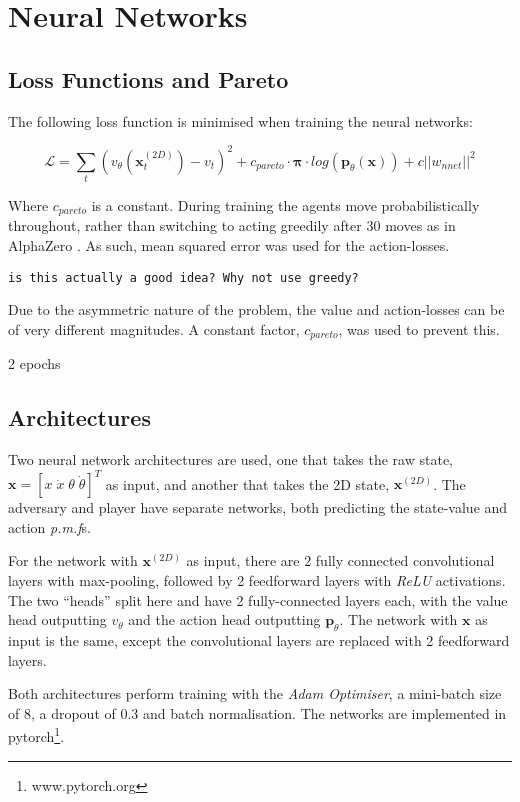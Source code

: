 \documentclass[../main.tex]{subfiles}
\begin{document}
\section{Neural Networks}
\subsection{Loss Functions and Pareto}

The following loss function is minimised when training the neural networks:

\begin{equation}
   \mathcal{L} = \sum_t (v_\theta (\boldsymbol{x}^{(2D)}_t) - v_t)^2 + c_{pareto} \cdot \boldsymbol{\pi} \cdot log(\boldsymbol{p}_\theta(\boldsymbol{x}))  + c||w_{nnet}||^2
\end{equation}

Where $c_{pareto}$ is a constant. During training the agents move probabilistically throughout, rather than switching to acting greedily after 30 moves as in AlphaZero \cite{AlphaZero}. As such, mean squared error was used for the action-losses.

\texttt{is this actually a good idea? Why not use greedy?}

Due to the asymmetric nature of the problem, the value and action-losses can be of very different magnitudes. A constant factor, $c_{pareto}$, was used to prevent this.

2 epochs
\subsection{Architectures}
Two neural network architectures are used, one that takes the raw state, $\boldsymbol{x} = [x \; \dot{x} \; \theta \; \dot{\theta}]^T$ as input, and another that takes the 2D state, $\boldsymbol{x}^{(2D)}$. The adversary and player have separate networks, both predicting the state-value and action \textit{p.m.f}s.

For the network with $\boldsymbol{x}^{(2D)}$ as input, there are 2 fully connected convolutional layers with max-pooling, followed by 2 feedforward layers with \textit{ReLU} activations. The two ``heads'' split here and have 2 fully-connected layers each, with the value head outputting $v_\theta$ and the action head outputting $\boldsymbol{p}_\theta$. The network with $\boldsymbol{x}$ as input is the same, except the convolutional layers are replaced with 2 feedforward layers.

Both architectures perform training with the \textit{Adam Optimiser}, a mini-batch size of 8, a dropout of 0.3 and batch normalisation. The networks are implemented in pytorch\footnote{www.pytorch.org}.
\end{document}
